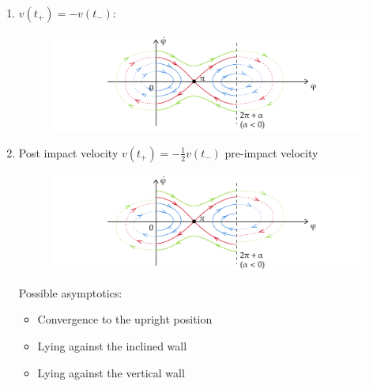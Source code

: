\begin{solution}[1.1]
\begin{enumerate}
\begin{enumerate}
\item $ v(t_+) = -v(t_-) $:

\begin{figure}[h]
	\centering
	\includegraphics[scale=0.9]{figures/solutions/ch1/S02D08.pdf}
\end{figure}

\item Post impact velocity $ v(t_+) = -\frac{1}{2}v(t_-) $ pre-impact velocity
\begin{figure}[h]
	\centering
	\includegraphics[scale=0.9]{figures/solutions/ch1/S02D09.pdf}
\end{figure}
Possible asymptotics:
\begin{itemize}
	\item Convergence to the upright position
	\item Lying against the inclined wall
	\item Lying against the vertical wall
\end{itemize}
\end{enumerate}

\end{enumerate}
\end{solution}



